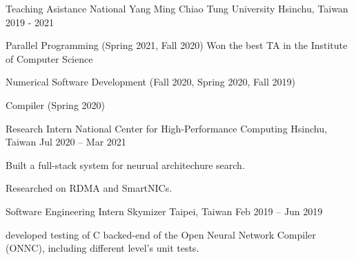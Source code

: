 

\begin{cventries}

  \cventry
    {Teaching Asistance} %
    {National Yang Ming Chiao Tung University} %
    {Hsinchu, Taiwan} %
    {2019 - 2021} %
    {
      \begin{cvitems} %
        \item {Parallel Programming (Spring 2021, Fall 2020) Won the best TA in the Institute of Computer Science}
        \item {Numerical Software Development (Fall 2020, Spring 2020, Fall 2019)}
        \item {Compiler (Spring 2020)}
      \end{cvitems}
    }

  \cventry
    {Research Intern} %
    {National Center for High-Performance Computing} %
    {Hsinchu, Taiwan} %
    {Jul 2020 – Mar 2021} %
    {
      \begin{cvitems} %
        \item {Built a full-stack system for neurual architechure search.}
        \item {Researched on RDMA and SmartNICs.}
      \end{cvitems}
    }

  \cventry
    {Software Engineering Intern} %
    {Skymizer} %
    {Taipei, Taiwan} %
    {Feb 2019 – Jun 2019} %
    {
      \begin{cvitems} %
        \item {developed testing of C backed-end of the Open Neural Network Compiler (ONNC), including different level's unit tests.}
      \end{cvitems}
    }


\end{cventries}
